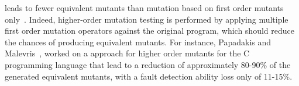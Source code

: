   leads to fewer equivalent mutants than mutation based on first order mutants only~\cite{jia2009higher,kintis2010evaluating,offutt1992investigations,papadakis2010empirical}. Indeed, higher-order mutation testing is performed by applying multiple first order mutation operators against the original program, 
which should reduce the chances of producing equivalent mutants. 
For instance, Papadakis and Malevris~\cite{papadakis2010empirical}, worked on a approach for higher order mutants for the C programming language that lead to a reduction of approximately 80-90\% of the generated equivalent mutants, with a fault detection ability loss only of 11-15\%. 

\endinput


